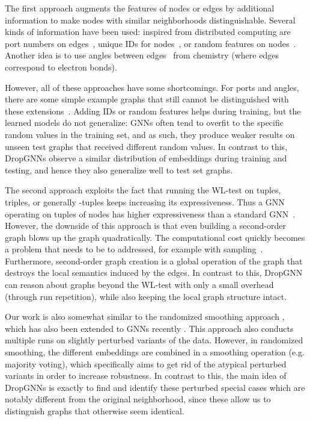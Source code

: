 \documentclass{article}
\begin{document}
The first approach augments the features of nodes or edges by additional information to make nodes with similar neighborhoods distinguishable. Several kinds of information have been used: inspired from distributed computing are port numbers on edges~\citep{ports}, unique IDs for nodes~\citep{loukas2020graph}, or random features on nodes~\citep{randomFeatures1, randomFeatures2}. Another idea is to use angles between edges~\citep{angles} from chemistry (where edges correspond to electron bonds).

However, all of these approaches have some shortcomings. For ports and angles, there are some simple example graphs that still cannot be distinguished with these extensions~\citep{limits}. Adding IDs or random features helps during training, but the learned models do not generalize: GNNs often tend to overfit to the specific random values in the training set, and as such, they produce weaker results on unseen test graphs that received different random values. In contrast to this, DropGNNs observe a similar distribution of embeddings during training and testing, and hence they also generalize well to test set graphs.

The second approach exploits the fact that running the WL-test on tuples, triples, or generally -tuples keeps increasing its expressiveness. Thus a GNN operating on tuples of nodes has higher expressiveness than a standard GNN~\citep{morris2019weisfeiler, maron2019provably}. However, the downside of this approach is that even building a second-order graph blows up the graph quadratically. The computational cost quickly becomes a problem that needs to be to addressed, for example with sampling~\citep{morris2019weisfeiler}. Furthermore, second-order graph creation is a global operation of the graph that destroys the local semantics induced by the edges. In contrast to this, DropGNN can reason about graphs beyond the WL-test with only a small overhead (through run repetition), while also keeping the local graph structure intact.

Our work is also somewhat similar to the randomized smoothing approach \citep{cohen2019certified}, which has also been extended to GNNs recently \citep{bojchevski2020efficient}. This approach also conducts multiple runs on slightly perturbed variants of the data. However, in randomized smoothing, the different embeddings are combined in a smoothing operation (e.g. majority voting), which specifically aims to get rid of the atypical perturbed variants in order to increase robustness. In contrast to this, the main idea of DropGNNs is exactly to find and identify these perturbed special cases which are notably different from the original neighborhood, since these allow us to distinguish graphs that otherwise seem identical.
\end{document}
